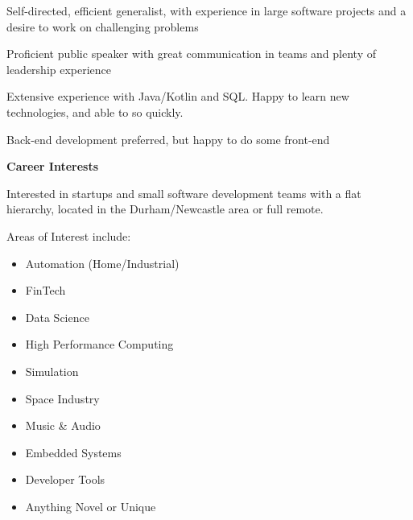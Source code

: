 \documentclass[hidelinks, 12pt, a4paper]{article}
\newcommand{\smitem}[1]{\item {\small {#1}}}
\newenvironment{bullets}{\begin{minipage}[t]{\linewidth}\begin{itemize}[leftmargin=2em,label=-,nosep]}{\end{itemize}\end{minipage}\vspace{5pt}}
\begin{document}
{\begin{minipage}{\dimexpr0.35\textwidth-2\fboxrule-2\fboxsep\relax}
\begin{center}
\begin{minipage}{0.9\linewidth}
					Self-directed, efficient generalist, with experience in large software projects and a desire to work on challenging problems
					
					\vspace{8pt}
					
					Proficient public speaker with great communication in teams and plenty of leadership experience
					
					\vspace{8pt}
					
					Extensive experience with Java/Kotlin and SQL. Happy to learn new technologies, and able to so quickly.
					
					\vspace{8pt}
					
					Back-end development preferred, but happy to do some front-end
					
					\vspace{8pt}
					
					\begin{center}
						\begin{Large}
							\textbf{Career Interests}
						\end{Large}
					\end{center}
					
					Interested in startups and small software development teams with a flat hierarchy, located in the Durham/Newcastle area or full remote.
					
					Areas of Interest include:
					\vspace{8pt}
				\end{minipage}
			
				\begin{bullets}
					\smitem{Automation (Home/Industrial)}
					\smitem{FinTech}
					\smitem{Data Science}
					\smitem{High Performance Computing}
					\smitem{Simulation}
					\smitem{Space Industry}
					\smitem{Music \& Audio}
					\smitem{Embedded Systems}
					\smitem{Developer Tools}
					\smitem{Anything Novel or Unique}
				\end{bullets}
			\vspace{30pt}
			\end{center}
		\end{minipage}
	}
	\hspace{0.02\textwidth}
\end{document}
